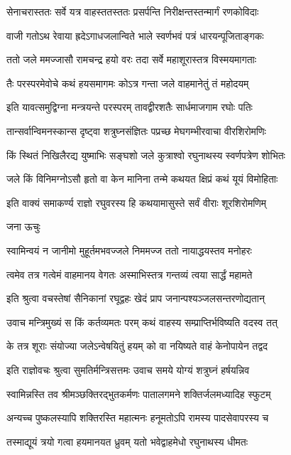 \twolineshloka
{सेनाचरास्ततः सर्वे यत्र वाहस्ततस्ततः}
{प्रसर्पन्ति निरीक्षन्तस्तन्मार्गं रणकोविदाः}%

\twolineshloka
{वाजी गतोऽथ रेवाया ह्रदेऽगाधजलान्विते}
{भाले स्वर्णभवं पत्रं धारयन्पूजिताङ्गकः}%

\twolineshloka
{ततो जले ममज्जासौ रामचन्द्र हयो वरः}
{तदा सर्वे महाशूरास्तत्र विस्मयमागताः}%

\twolineshloka
{तैः परस्परमेवोचे कथं हयसमागमः}
{कोऽत्र गन्ता जले वाहमानेतुं तं महोदयम्}%

\twolineshloka
{इति यावत्समुद्विग्ना मन्त्रयन्ते परस्परम्}
{तावद्वीरशतैः सार्धमाजगाम रघोः पतिः}%

\twolineshloka
{तान्सर्वान्विमनस्कान्स दृष्ट्वा शत्रुघ्नसंज्ञितः}
{पप्रच्छ मेघगम्भीरवाचा वीरशिरोमणिः}%

\twolineshloka
{किं स्थितं निखिलैरद्य युष्माभिः सङ्घशो जले}
{कुत्राश्वो रघुनाथस्य स्वर्णपत्रेण शोभितः}%

\twolineshloka
{जले किं विनिमग्नोऽसौ हृतो वा केन मानिना}
{तन्मे कथयत क्षिप्रं कथं यूयं विमोहिताः}%


\twolineshloka
{इति वाक्यं समाकर्ण्य राज्ञो रघुवरस्य हि}
{कथयामासुस्ते सर्वं वीराः शूरशिरोमणिम्}%

जना ऊचुः

\twolineshloka
{स्वामिन्वयं न जानीमो मुहूर्तमभवज्जले}
{निममज्ज ततो नायाद्धयस्तव मनोहरः}%

\twolineshloka
{त्वमेव तत्र गत्वेमं वाहमानय वेगतः}
{अस्माभिस्तत्र गन्तव्यं त्वया सार्द्धं महामते}%

\twolineshloka
{इति श्रुत्वा वचस्तेषां सैनिकानां रघूद्वहः}
{खेदं प्राप जनान्पश्यञ्जलसन्तरणोद्यतान्}%

\twolineshloka
{उवाच मन्त्रिमुख्यं स किं कर्तव्यमतः परम्}
{कथं वाहस्य सम्प्राप्तिर्भविष्यति वदस्व तत्}%

\twolineshloka
{के तत्र शूराः संयोज्या जलेऽन्वेषयितुं हयम्}
{को वा नयिष्यते वाहं केनोपायेन तद्वद}%

\twolineshloka
{इति राज्ञोवचः श्रुत्वा सुमतिर्मन्त्रिसत्तमः}
{उवाच समये योग्यं शत्रुघ्नं हर्षयन्निव}%

\twolineshloka
{स्वामिन्नस्ति तव श्रीमञ्छक्तिरद्भुतकर्मणः}
{पातालगमने शक्तिर्जलमध्यादिह स्फुटम्}%

\twolineshloka
{अन्यच्च पुष्कलस्यापि शक्तिरस्ति महात्मनः}
{हनूमतोऽपि रामस्य पादसेवापरस्य च}%

\twolineshloka
{तस्माद्यूयं त्रयो गत्वा हयमानयत ध्रुवम्}
{यतो भवेद्वाहमेधो रघुनाथस्य धीमतः}%

